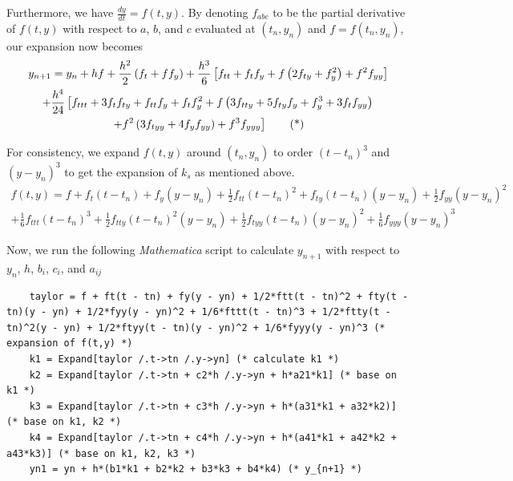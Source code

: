 \documentclass[a4paper]{article}
\begin{document}
Furthermore, we have \(\frac{dy}{dt} = f(t,y)\). By denoting \(f_{abc}\) to be the partial derivative of \(f(t,y)\) with respect to \(a\), \(b\), and \(c\) evaluated at \((t_n, y_n)\) and \(f = f(t_n, y_n)\), our expansion now becomes
\begin{multline*}
  y_{n+1} = y_n + hf + \frac{h^2}{2}\left(f_t + f f_y\right) + \frac{h^3}{6}\left[f_{tt} + f_t f_y + f\left(2f_{ty} + f_y^2\right) + f^2 f_{yy}\right] \\
  + \frac{h^4}{24}\left[f_{ttt} + 3f_t f_{ty} + f_{tt} f_y + f_t f_y^2 + f\left(3f_{tty} + 5f_{ty} f_y + f_y^3 + 3f_t f_{yy}\right)\right.     \\
    \left.+ f^2\left(3f_{tyy} + 4f_y f_{yy}\right) + f^3 f_{yyy}\vphantom{f_y^3}\right] \tag{*}
\end{multline*}

For consistency, we expand \(f(t,y)\) around \((t_n, y_n)\) to order \({(t-t_n)}^3\) and \({(y-y_n)}^3\) to get the expansion of \(k_s\) as mentioned above.
\begin{multline*}
  f(t,y) = f + f_t(t-t_n) + f_y(y-y_n) + \frac{1}{2}f_{tt}{(t-t_n)}^2 + f_{ty}(t-t_n)(y-y_n) + \frac{1}{2}f_{yy}{(y-y_n)}^2                        \\
  + \frac{1}{6}f_{ttt}{(t-t_n)}^3 + \frac{1}{2}f_{tty}{(t-t_n)}^2(y-y_n) + \frac{1}{2}f_{tyy}(t-t_n){(y-y_n)}^2 + \frac{1}{6}f_{yyy}{(y-y_n)}^3
\end{multline*}

Now, we run the following \textit{Mathematica} script to calculate \(y_{n+1}\) with respect to \(y_n\), \(h\), \(b_i\), \(c_i\), and \(a_{ij}\)
\begin{mdframed}[leftline=false,rightline=false,backgroundcolor=magenta!10,nobreak=true]
  \begin{verbatim}
    taylor = f + ft(t - tn) + fy(y - yn) + 1/2*ftt(t - tn)^2 + fty(t - tn)(y - yn) + 1/2*fyy(y - yn)^2 + 1/6*fttt(t - tn)^3 + 1/2*ftty(t - tn)^2(y - yn) + 1/2*ftyy(t - tn)(y - yn)^2 + 1/6*fyyy(y - yn)^3 (* expansion of f(t,y) *)
    k1 = Expand[taylor /.t->tn /.y->yn] (* calculate k1 *)
    k2 = Expand[taylor /.t->tn + c2*h /.y->yn + h*a21*k1] (* base on k1 *)
    k3 = Expand[taylor /.t->tn + c3*h /.y->yn + h*(a31*k1 + a32*k2)] (* base on k1, k2 *)
    k4 = Expand[taylor /.t->tn + c4*h /.y->yn + h*(a41*k1 + a42*k2 + a43*k3)] (* base on k1, k2, k3 *)
    yn1 = yn + h*(b1*k1 + b2*k2 + b3*k3 + b4*k4) (* y_{n+1} *)
  \end{verbatim}
\end{mdframed}
\end{document}
